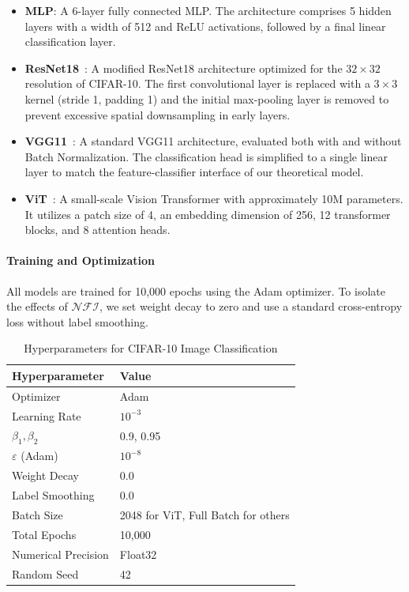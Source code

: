 \documentclass{article}
\theoremstyle{plain}
\theoremstyle{definition}
\theoremstyle{remark}
\begin{document}
\begin{itemize}
\item \textbf{MLP}: A 6-layer fully connected MLP. The architecture comprises 5 hidden layers with a width of 512 and ReLU activations, followed by a final linear classification layer.
\item \textbf{ResNet18}~\cite{he2016}: A modified ResNet18 architecture optimized for the $32 \times 32$ resolution of CIFAR-10. The first convolutional layer is replaced with a $3 \times 3$ kernel (stride 1, padding 1) and the initial max-pooling layer is removed to prevent excessive spatial downsampling in early layers.
\item \textbf{VGG11}~\cite{simonyan2015}: A standard VGG11 architecture, evaluated both with and without Batch Normalization. The classification head is simplified to a single linear layer to match the feature-classifier interface of our theoretical model.
\item \textbf{ViT}~\cite{dosovitskiy2021}: A small-scale Vision Transformer with approximately 10M parameters. It utilizes a patch size of 4, an embedding dimension of 256, 12 transformer blocks, and 8 attention heads.
\end{itemize}



\paragraph{Training and Optimization}
All models are trained for 10,000 epochs using the Adam optimizer. 
To isolate the effects of $\mathcal{NFI}$, we set weight decay to zero and use a standard cross-entropy loss without label smoothing.
\begin{table}[h!]
\centering
\caption{Hyperparameters for CIFAR-10 Image Classification}
\label{tab:hyperparams-cifar}
\begin{tabular}{ll}
\hline
\textbf{Hyperparameter} & \textbf{Value} \\ 
\hline
Optimizer & Adam \\
Learning Rate & $10^{-3}$ \\
$\beta_1, \beta_2$ & 0.9, 0.95 \\
$\varepsilon$ (Adam) & $10^{-8}$ \\
Weight Decay & 0.0 \\
Label Smoothing & 0.0 \\
Batch Size & 2048 for ViT, Full Batch for others \\
Total Epochs & 10,000 \\
Numerical Precision & Float32 \\
Random Seed & 42 \\ 
\hline
\end{tabular}
\end{table}
\end{document}
